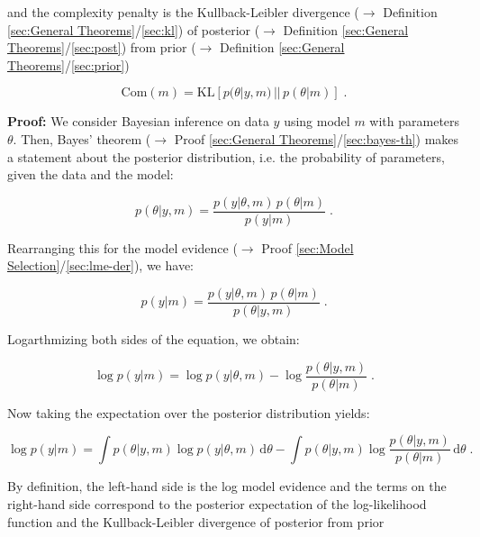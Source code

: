\documentclass[a4paper,12pt,twoside]{book}
\begin{document}
and the complexity penalty is the Kullback-Leibler divergence ($\rightarrow$ Definition \ref{sec:General Theorems}/\ref{sec:kl}) of posterior ($\rightarrow$ Definition \ref{sec:General Theorems}/\ref{sec:post}) from prior ($\rightarrow$ Definition \ref{sec:General Theorems}/\ref{sec:prior})

\begin{equation} \label{eq:lme-anc-Com}
\mathrm{Com}(m) = \mathrm{KL} \left[ p(\theta|y,m) \, || \, p(\theta|m) \right] \; .
\end{equation}


\vspace{1em}
\textbf{Proof:} We consider Bayesian inference on data $y$ using model $m$ with parameters $\theta$. Then, Bayes' theorem ($\rightarrow$ Proof \ref{sec:General Theorems}/\ref{sec:bayes-th}) makes a statement about the posterior distribution, i.e. the probability of parameters, given the data and the model:

\begin{equation} \label{eq:lme-anc-AnC-s1}
p(\theta|y,m) = \frac{p(y|\theta,m) \, p(\theta|m)}{p(y|m)} \; .
\end{equation}

Rearranging this for the model evidence ($\rightarrow$ Proof \ref{sec:Model Selection}/\ref{sec:lme-der}), we have:

\begin{equation} \label{eq:lme-anc-AnC-s2}
p(y|m) = \frac{p(y|\theta,m) \, p(\theta|m)}{p(\theta|y,m)} \; .
\end{equation}

Logarthmizing both sides of the equation, we obtain:

\begin{equation} \label{eq:lme-anc-AnC-s3}
\log p(y|m) = \log p(y|\theta,m) - \log \frac{p(\theta|y,m)}{p(\theta|m)} \; .
\end{equation}

Now taking the expectation over the posterior distribution yields:

\begin{equation} \label{eq:lme-anc-AnC-s4}
\log p(y|m) = \int p(\theta|y,m) \log p(y|\theta,m) \, \mathrm{d}\theta - \int p(\theta|y,m) \log \frac{p(\theta|y,m)}{p(\theta|m)} \, \mathrm{d}\theta \; .
\end{equation}

By definition, the left-hand side is the log model evidence and the terms on the right-hand side correspond to the posterior expectation of the log-likelihood function and the Kullback-Leibler divergence of posterior from prior
\end{document}
